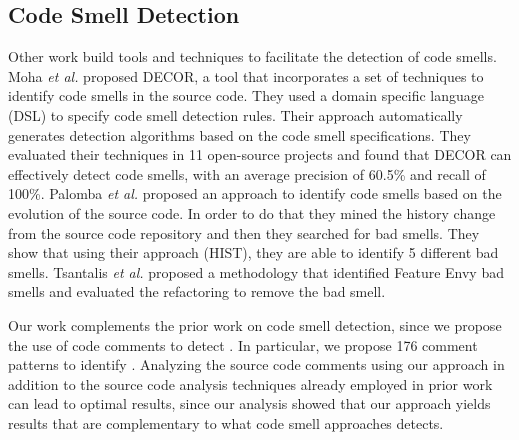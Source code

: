 \subsection{Code Smell Detection}

Other work build tools and techniques to facilitate the detection of code smells. Moha \textit{et al.} \cite{Moha2010TSE} proposed DECOR, a tool that incorporates a set of techniques to identify code smells in the source code. They used a domain specific language (DSL) to specify code smell detection rules. Their approach automatically generates detection algorithms based on the code smell specifications. They evaluated their techniques in 11 open-source projects and found that DECOR can effectively detect code smells, with an average precision of 60.5\% and recall of 100\%. Palomba \textit{et al.} \cite{Palomba2013} proposed an approach to identify code smells based on the evolution of the source code. In order to do that they mined the history change from the source code repository and then they searched for bad smells. They show that using their approach (HIST), they are able to identify 5 different bad smells. Tsantalis \textit{et al.} \cite{Tsantalis2009TSE} proposed a methodology that identified Feature Envy bad smells and evaluated the refactoring to remove the bad smell.

Our work complements the prior work on code smell detection, since we propose the use of code comments to detect \SATD. In particular, we propose 176 comment patterns to identify \SATD. Analyzing the source code comments using our approach in addition to the source code analysis techniques already employed in prior work can lead to optimal results, since our analysis showed that our approach yields results that are complementary to what code smell approaches detects.